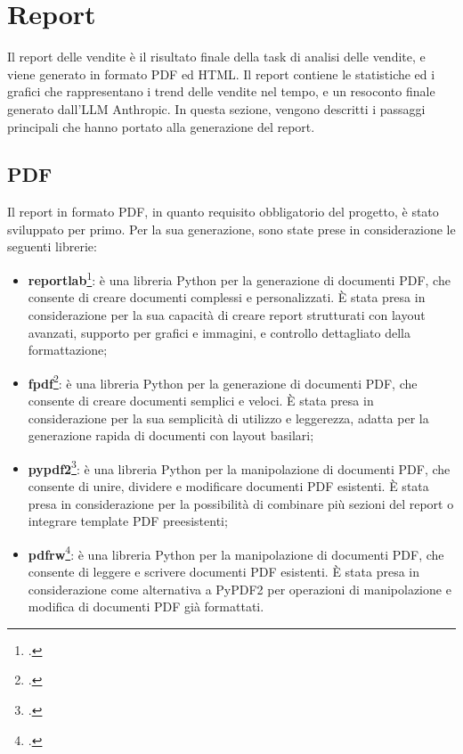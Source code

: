 \section{Report}

Il report delle vendite è il risultato finale della task di analisi delle vendite, e viene generato in formato PDF ed HTML. Il report contiene le statistiche ed i grafici che rappresentano i trend delle vendite nel tempo, e un resoconto finale generato dall'LLM Anthropic.
In questa sezione, vengono descritti i passaggi principali che hanno portato alla generazione del report.

\subsection{PDF}

Il report in formato PDF, in quanto requisito obbligatorio del progetto, è stato sviluppato per primo. Per la sua generazione, sono state prese in considerazione le seguenti librerie:
\begin{itemize}
    \item \textbf{\gls{reportlab}}\footcite{site:reportlab}: è una libreria Python per la generazione di documenti PDF, che consente di creare documenti complessi e personalizzati. È stata presa in considerazione per la sua capacità di creare report strutturati con layout avanzati, supporto per grafici e immagini, e controllo dettagliato della formattazione;
    \item \textbf{\gls{fpdf}}\footcite{site:fpdf}: è una libreria Python per la generazione di documenti PDF, che consente di creare documenti semplici e veloci. È stata presa in considerazione per la sua semplicità di utilizzo e leggerezza, adatta per la generazione rapida di documenti con layout basilari;
    \item \textbf{\gls{pypdf2}}\footcite{site:pypdf2}: è una libreria Python per la manipolazione di documenti PDF, che consente di unire, dividere e modificare documenti PDF esistenti. È stata presa in considerazione per la possibilità di combinare più sezioni del report o integrare template PDF preesistenti;
    \item \textbf{\gls{pdfrw}}\footcite{site:pdfrw}: è una libreria Python per la manipolazione di documenti PDF, che consente di leggere e scrivere documenti PDF esistenti. È stata presa in considerazione come alternativa a PyPDF2 per operazioni di manipolazione e modifica di documenti PDF già formattati.
\end{itemize}

